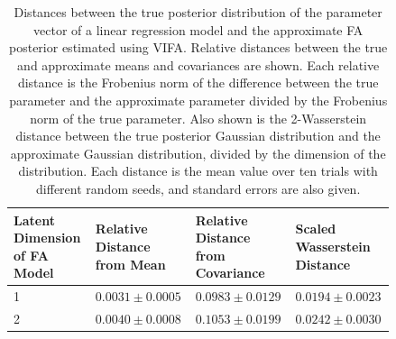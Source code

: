 \documentclass[msc,deptreport.inf]{infthesis} %
\begin{document}
\begin{table}[h!]
	\begin{center}
		\begin{tabular}{|| p{0.21\linewidth} p{0.21\linewidth} p{0.21\linewidth} p{0.21\linewidth} ||} 
 			\hline
 			Latent Dimension of FA Model & Relative Distance from Mean & Relative Distance from Covariance & Scaled Wasserstein Distance \\ [0.5ex] 
 			\hline\hline
			1 	& $0.0031 \pm 0.0005$ 	& $0.0983 \pm 0.0129$ 	& $0.0194 \pm 0.0023$ \\ [1ex] 
			\hline
 			2 	& $0.0040 \pm 0.0008$ 	& $ 0.1053 \pm 0.0199$ 	& $0.0242 \pm 0.0030$ \\ [1ex] 
			\hline
		\end{tabular}
		\caption{Distances between the true posterior distribution of the parameter vector of a linear regression model and the approximate FA posterior estimated using VIFA. Relative distances between the true and approximate means and covariances are shown. Each relative distance is the Frobenius norm of the difference between the true parameter and the approximate parameter divided by the Frobenius norm of the true parameter. Also shown is the 2-Wasserstein distance between the true posterior Gaussian distribution and the approximate Gaussian distribution, divided by the dimension of the distribution. Each distance is the mean value over ten trials with different random seeds, and standard errors are also given.}
		\label{table:linear_regression_vi_posterior}
	\end{center}
\end{table}
\end{document}
